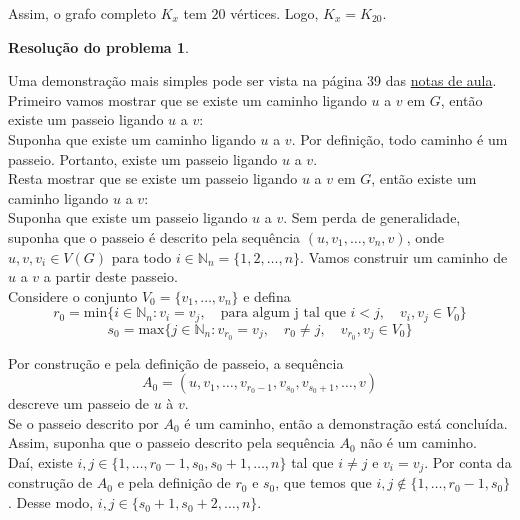 \documentclass[12pt, a4paper]{article}
\theoremstyle{definition} \newtheorem{prob}{Problema}
\newtheorem{res}{Resolução do problema}
\theoremstyle{plain} \newtheorem*{teo}{Teorema}
\begin{document}
Assim, o grafo completo \(K_x\) tem \(20\) vértices. Logo, \(K_x = K_{20}\).



\begin{res} %
\end{res}

Uma demonstração mais simples pode ser vista na página 39 das \href{https://drive.google.com/file/d/16Gy9vck48p64A-3u1t2-uUVGOVqOlAOg/view}{notas de aula}. \\

Primeiro vamos mostrar que se existe um caminho ligando \(u\) a \(v\) em \(G\), então existe um passeio ligando \(u\) a \(v\): \\

Suponha que existe um caminho ligando \(u\) a \(v\). Por definição, todo caminho é um passeio. Portanto, existe um passeio ligando \(u\) a \(v\). \\

Resta mostrar que se existe um passeio ligando \(u\) a \(v\) em \(G\), então existe um caminho ligando \(u\) a \(v\): \\

Suponha que existe um passeio ligando \(u\) a \(v\). Sem perda de generalidade, suponha que o passeio é descrito pela sequência \((u, v_1, \ldots, v_n,  v)\), onde \(u, v, v_i \in V(G)\) para todo \(i \in \mathbb{N}_n = \{1, 2, \ldots, n\}\). Vamos construir um caminho de \(u\) a \(v\) a partir deste passeio. \\

Considere o conjunto \(V_0 = \{v_1, \ldots, v_n\}\) e defina \[r_0 = \mathrm{min}\{i \in \mathbb{N}_n : v_i = v_j, \quad \text{para algum j tal que }i < j, \quad v_i, v_j \in V_0\}\] \[s_0 = \mathrm{max}\{j \in \mathbb{N}_n: v_{r_0} = v_j, \quad r_0 \neq j, \quad v_{r_0}, v_j \in V_0\}\]

Por construção e pela definição de passeio, a sequência \[A_0=(u, v_1, \ldots, v_{r_0-1}, v_{s_0}, v_{s_0+1}, \ldots, v)\] descreve um passeio de \(u\) à \(v\). \\

Se o passeio descrito por \(A_0\) é um caminho, então a demonstração está concluída. Assim, suponha que o passeio descrito pela sequência \(A_0\) não é um caminho.\\

Daí, existe \(i, j \in \{1, \ldots, r_0-1, s_0, s_0+1, \ldots, n\}\) tal que \(i \neq j\) e \(v_i = v_j\). Por conta da construção de \(A_0\) e pela definição de \(r_0\) e \(s_0\), que temos que \(i,j \notin \{1, \ldots, r_0-1, s_0\}\). Desse modo, \(i,j \in \{s_0+1, s_0+2, \ldots, n\}\). \\
\end{document}
